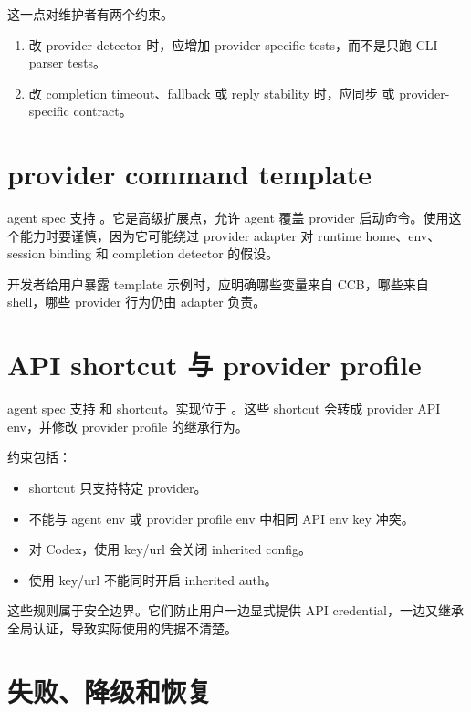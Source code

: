 这一点对维护者有两个约束。

\begin{enumerate}
  \item 改 provider detector 时，应增加 provider-specific tests，而不是只跑 CLI parser tests。
  \item 改 completion timeout、fallback 或 reply stability 时，应同步  或 provider-specific contract。
\end{enumerate}

\section{provider command template}

agent spec 支持 。它是高级扩展点，允许 agent 覆盖 provider 启动命令。使用这个能力时要谨慎，因为它可能绕过 provider adapter 对 runtime home、env、session binding 和 completion detector 的假设。

开发者给用户暴露 template 示例时，应明确哪些变量来自 CCB，哪些来自 shell，哪些 provider 行为仍由 adapter 负责。

\section{API shortcut 与 provider profile}

agent spec 支持  和  shortcut。实现位于 。这些 shortcut 会转成 provider API env，并修改 provider profile 的继承行为。

约束包括：

\begin{itemize}
  \item shortcut 只支持特定 provider。
  \item 不能与 agent env 或 provider profile env 中相同 API env key 冲突。
  \item 对 Codex，使用 key/url 会关闭 inherited config。
  \item 使用 key/url 不能同时开启 inherited auth。
\end{itemize}

这些规则属于安全边界。它们防止用户一边显式提供 API credential，一边又继承全局认证，导致实际使用的凭据不清楚。

\section{失败、降级和恢复}

